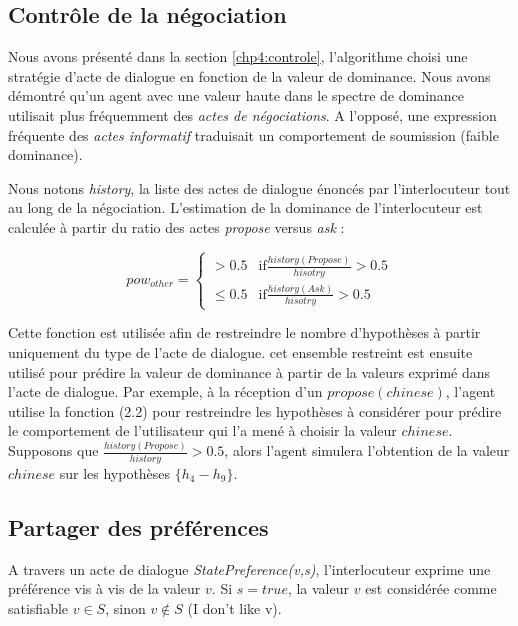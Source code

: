 	\subsection{Contrôle de la négociation}	
	
	Nous avons présenté dans la section \ref{chp4:controle}, l'algorithme  choisi une stratégie d'acte de dialogue en fonction de la valeur de dominance. Nous avons démontré qu'un agent avec une valeur haute dans le spectre de dominance utilisait plus fréquemment des \emph{actes de négociations}. A l'opposé, une expression fréquente des \emph{actes informatif} traduisait un comportement de soumission (faible dominance). 
	
	Nous notons \textit{history}, la liste des actes de dialogue énoncés par l'interlocuteur tout au long de la négociation. L'estimation de la dominance de l'interlocuteur est calculée à partir du ratio des actes \emph{propose} versus \emph{ask} :
	
	\begin{equation}
	pow_{other} = \left\{\begin{array}{ll}
	> 0.5 & \mathrm{if } \frac{history(Propose)}{hisotry} > 0.5\\
	\leq 0.5 & \mathrm{if  } \frac{history(Ask)}{hisotry} > 0.5
	\end{array}\right.
	\end{equation}
	
	Cette fonction est utilisée afin de restreindre le nombre d'hypothèses à partir uniquement du type de l'acte de dialogue. cet ensemble restreint est ensuite utilisé pour prédire la valeur de dominance à partir de la valeurs exprimé dans l'acte de dialogue. Par exemple, à la réception d'un $propose(chinese)$, l'agent utilise la fonction (2.2) pour restreindre les hypothèses à considérer pour prédire le comportement de l'utilisateur qui l'a mené à choisir la valeur $chinese$. Supposons que $\frac{history(Propose)}{history} > 0.5$, alors l'agent simulera l'obtention de la valeur $chinese$ sur les hypothèses $\{h_4 - h_9\}$.
	

\subsection{Partager des préférences}
A travers un acte de dialogue \emph{StatePreference(v,s)}, l'interlocuteur exprime une préférence vis à vis de la valeur $v$. Si $s =true$, la valeur $v$ est considérée comme satisfiable $v \in S$, sinon $v \not \in S$ (I don't like v). 

